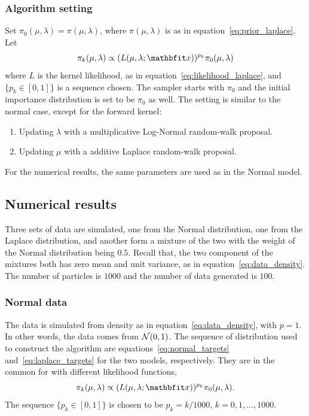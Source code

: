 \subsubsection{Algorithm setting}

Set $\pi_0(\mu,\lambda) = \pi(\mu,\lambda)$, where $\pi(\mu,\lambda)$ is as in
equation~\ref{eq:prior_laplace}. Let
\begin{equation}
  \pi_k(\mu,\lambda) \propto (L(\mu,\lambda;\bfx))^{p_k}\pi_0(\mu,\lambda)
  \label{eq:laplace_targets}
\end{equation}
where $L$ is the kernel likelihood, as in
equation~\eqref{eq:likelihood_laplace}, and $\{p_k\in[0,1]\}$ is a sequence
chosen. The \smc sampler starts with $\pi_0$ and the initial importance
distribution is set to be $\pi_0$ as well. The setting is similar to the
normal case, except for the forward kernel:
\begin{enumerate}
  \item Updating $\lambda$ with a multiplicative Log-Normal random-walk
    proposal.
  \item Updating $\mu$ with a additive Laplace random-walk proposal.
\end{enumerate}

\begin{remark}
  For the numerical results, the same parameters are used as in the Normal
  model.
\end{remark}

\subsection{Numerical results}
\label{sub:Numerical results}

Three sets of data are simulated, one from the Normal distribution, one from
the Laplace distribution, and another form a mixture of the two with the
weight of the Normal distribution being $0.5$. Recall that, the two component
of the mixtures both has zero mean and unit variance, as in
equation~\eqref{eq:data_density}. The number of particles is $1000$ and the
number of data generated is $100$.

\subsubsection{Normal data}

The data is simulated from density as in equation~\eqref{eq:data_density},
with $p = 1$. In other words, the data comes from $\mathcal{N}(0,1)$. The sequence
of distribution used to construct the \smc algorithm are
equations~\eqref{eq:normal_targets} and~\eqref{eq:laplace_targets} for the two
models, respectively. They are in the common for with different likelihood
functions,
\begin{equation*}
  \pi_k(\mu,\lambda) \propto (L(\mu,\lambda;\bfx))^{p_k}\pi_0(\mu,\lambda).
\end{equation*}
The sequence $\{p_k\in[0,1]\}$ is chosen to be $p_k = k / 1000$, $k = 0, 1,
\dots, 1000$.

